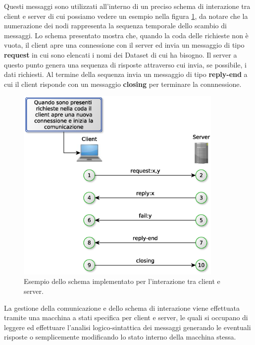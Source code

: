 Questi messaggi sono utilizzati all'interno di un preciso schema di interazione tra client e server di cui possiamo vedere un esempio nella figura \ref{f:clientserverinteraction}, da notare che la numerazione dei nodi rappresenta la sequenza temporale dello scambio di messaggi. Lo schema presentato mostra che, quando la coda delle richieste non \`e vuota, il client apre una connessione con il server ed invia un messaggio di tipo \textbf{request} in cui sono elencati i nomi dei Dataset di cui ha bisogno. Il server a questo punto genera una sequenza di risposte attraverso cui invia, se possibile, i dati richiesti. Al termine della sequenza invia un messaggio di tipo \textbf{reply-end} a cui il client risponde con un messaggio \textbf{closing} per terminare la connnessione.

\begin{figure}
\begin{center}
\includegraphics[width=10cm]{Immagini/InterazioniClientServer}
\caption{Esempio dello schema implementato per l'interazione tra client e server.\label{f:clientserverinteraction}} 
\end{center} 
\end{figure}

La gestione della comunicazione e dello schema di interazione viene effettuata tramite una macchina a stati specifica per client e server, le quali si occupano di leggere ed effettuare l'analisi logico-sintattica dei messaggi generando le eventuali risposte o semplicemente modificando lo stato interno della macchina stessa.

